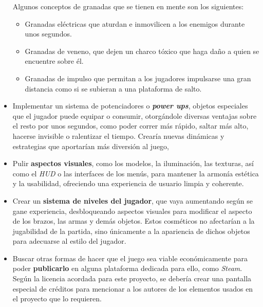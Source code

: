 \begin{itemize}
    Algunos conceptos de granadas que se tienen en mente son los siguientes:
    \begin{itemize}
    \item Granadas eléctricas que aturdan e inmovilicen a los enemigos durante unos segundos.
    \item Granadas de veneno, que dejen un charco tóxico que haga daño a quien se encuentre sobre él.
    \item Granadas de impulso que permitan a los jugadores impulsarse una gran distancia como si se subieran a una plataforma de salto.
    \end{itemize}
    \item Implementar un sistema de potenciadores o \textbf{\textit{power ups}}, objetos especiales que el jugador puede equipar o consumir, otorgándole diversas ventajas sobre el resto por unos segundos, como poder correr más rápido, saltar más alto, hacerse invisible o ralentizar el tiempo. Crearía nuevas dinámicas y estrategias que aportarían más diversión al juego,
    \item Pulir \textbf{aspectos visuales}, como los modelos, la iluminación, las texturas, así como el \textit{HUD} o  las interfaces de los menús, para mantener la armonía estética y la usabilidad, ofreciendo una experiencia de usuario limpia y coherente.
    \item Crear un \textbf{sistema de niveles del jugador}, que vaya aumentando según se gane experiencia, desbloqueando aspectos visuales para modificar el aspecto de los brazos, las armas y demás objetos. Estos cosméticos no afectarían a la jugabilidad de la partida, sino únicamente a la apariencia de dichos objetos para adecuarse al estilo del jugador.
    \item Buscar otras formas de hacer que el juego sea viable económicamente para poder \textbf{publicarlo} en alguna plataforma dedicada para ello, como \textit{Steam}. Según la licencia acordada para este proyecto, se debería crear una pantalla especial de créditos para mencionar a los autores de los elementos usados en el proyecto que lo requieren.
\end{itemize}